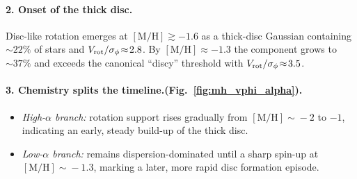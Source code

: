 \documentclass[a4paper,10pt]{article}
\begin{document}
\begin{multicols}{2}
\paragraph{2. Onset of the thick disc.}
Disc-like rotation emerges at $\mathrm{[M/H]}\gtrsim-1.6$ as a thick-disc
Gaussian containing $\sim22\%$ of stars and
$V_{\rm rot}/\sigma_\phi\!\approx\!2.8$.  By
$\mathrm{[M/H]}\approx-1.3$ the component grows to $\sim37\%$ and exceeds the
canonical “discy” threshold with $V_{\rm rot}/\sigma_\phi\!\approx\!3.5$.



\paragraph{3. Chemistry splits the timeline.(Fig.~\ref{fig:mh_vphi_alpha}).}
\begin{itemize}
  \item \textit{High-$\alpha$ branch:} rotation support rises gradually from
        $\mathrm{[M/H]}\!\sim\!-2$ to $-1$, indicating an early, steady build-up
        of the thick disc.
  \item \textit{Low-$\alpha$ branch:} remains dispersion-dominated until a
        sharp spin-up at $\mathrm{[M/H]}\!\sim\!-1.3$, marking a later, more
        rapid disc formation episode.
\end{itemize}


\end{multicols}
\end{document}
